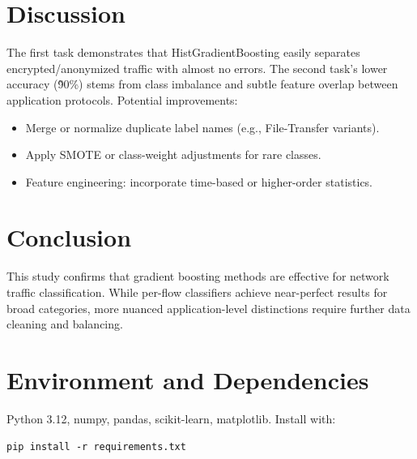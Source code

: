\documentclass[12pt]{article}
\begin{document}
\section{Discussion}
The first task demonstrates that HistGradientBoosting easily separates encrypted/anonymized traffic with almost no errors. The second task’s lower accuracy (\~90\%) stems from class imbalance and subtle feature overlap between application protocols. Potential improvements:
\begin{itemize}
  \item Merge or normalize duplicate label names (e.g., File-Transfer variants).
  \item Apply SMOTE or class-weight adjustments for rare classes.
  \item Feature engineering: incorporate time-based or higher-order statistics.
\end{itemize}

\section{Conclusion}
This study confirms that gradient boosting methods are effective for network traffic classification. While per-flow classifiers achieve near-perfect results for broad categories, more nuanced application-level distinctions require further data cleaning and balancing.

\appendix
\section{Environment and Dependencies}
Python 3.12, numpy, pandas, scikit-learn, matplotlib. Install with:
\begin{verbatim}
pip install -r requirements.txt
\end{verbatim}
\end{document}
